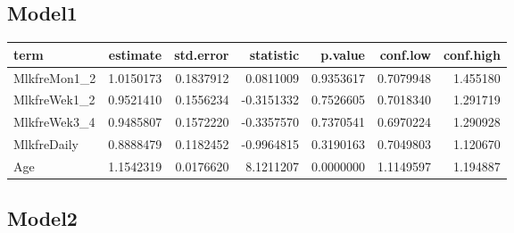 \documentclass[]{article}
\newenvironment{Shaded}{\begin{snugshade}}{\end{snugshade}}
\newcommand{\DataTypeTok}[1]{\textcolor[rgb]{0.13,0.29,0.53}{#1}}
\newcommand{\KeywordTok}[1]{\textcolor[rgb]{0.13,0.29,0.53}{\textbf{#1}}}
\newcommand{\NormalTok}[1]{#1}
\newcommand{\OperatorTok}[1]{\textcolor[rgb]{0.81,0.36,0.00}{\textbf{#1}}}
\newcommand{\OtherTok}[1]{\textcolor[rgb]{0.56,0.35,0.01}{#1}}
\newcommand{\StringTok}[1]{\textcolor[rgb]{0.31,0.60,0.02}{#1}}
\begin{document}
\hypertarget{model1-8}{%
\subsection{Model1}\label{model1-8}}

\begin{Shaded}
\end{Shaded}

\begin{longtable}[]{@{}lrrrrrr@{}}
\toprule
term & estimate & std.error & statistic & p.value & conf.low &
conf.high\tabularnewline
\midrule
\endhead
MlkfreMon1\_2 & 1.0150173 & 0.1837912 & 0.0811009 & 0.9353617 &
0.7079948 & 1.455180\tabularnewline
MlkfreWek1\_2 & 0.9521410 & 0.1556234 & -0.3151332 & 0.7526605 &
0.7018340 & 1.291719\tabularnewline
MlkfreWek3\_4 & 0.9485807 & 0.1572220 & -0.3357570 & 0.7370541 &
0.6970224 & 1.290928\tabularnewline
MlkfreDaily & 0.8888479 & 0.1182452 & -0.9964815 & 0.3190163 & 0.7049803
& 1.120670\tabularnewline
Age & 1.1542319 & 0.0176620 & 8.1211207 & 0.0000000 & 1.1149597 &
1.194887\tabularnewline
\bottomrule
\end{longtable}

\hypertarget{model2-8}{%
\subsection{Model2}\label{model2-8}}
\end{document}
